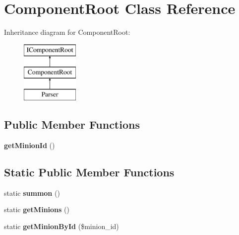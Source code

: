 \hypertarget{class_utopia_1_1_components_1_1_core_1_1_component_root}{
\section{ComponentRoot Class Reference}
\label{class_utopia_1_1_components_1_1_core_1_1_component_root}
}
Inheritance diagram for ComponentRoot:\begin{figure}[H]
\begin{center}
\leavevmode
\includegraphics[height=3.000000cm]{class_utopia_1_1_components_1_1_core_1_1_component_root}
\end{center}
\end{figure}
\subsection*{Public Member Functions}
\begin{DoxyCompactItemize}
\item 
\hypertarget{class_utopia_1_1_components_1_1_core_1_1_component_root_ab2389db7836a34a28e1f2a8af2cf548c}{
{\bfseries getMinionId} ()}
\label{class_utopia_1_1_components_1_1_core_1_1_component_root_ab2389db7836a34a28e1f2a8af2cf548c}

\end{DoxyCompactItemize}
\subsection*{Static Public Member Functions}
\begin{DoxyCompactItemize}
\item 
\hypertarget{class_utopia_1_1_components_1_1_core_1_1_component_root_ad48b4d368d94b22b9761cdd08a743099}{
static {\bfseries summon} ()}
\label{class_utopia_1_1_components_1_1_core_1_1_component_root_ad48b4d368d94b22b9761cdd08a743099}

\item 
\hypertarget{class_utopia_1_1_components_1_1_core_1_1_component_root_a06dd21eb163b3365bec1e555c9a4bb9c}{
static {\bfseries getMinions} ()}
\label{class_utopia_1_1_components_1_1_core_1_1_component_root_a06dd21eb163b3365bec1e555c9a4bb9c}

\item 
\hypertarget{class_utopia_1_1_components_1_1_core_1_1_component_root_a1fecf21cf426b19e07d2d6f8e65d0570}{
static {\bfseries getMinionById} (\$minion\_\-id)}
\label{class_utopia_1_1_components_1_1_core_1_1_component_root_a1fecf21cf426b19e07d2d6f8e65d0570}

\end{DoxyCompactItemize}

